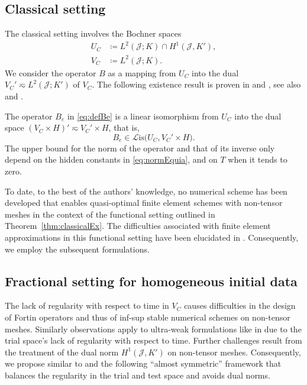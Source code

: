 \documentclass{amsart}
\newcommand{\cJ}{\mathcal J}
\newcommand{\cL}{\mathcal L}
\newcommand{\Lis}{\cL\mathrm{is}}
\begin{document}
\subsection{Classical setting}\label{subsec:ClassicalSetting}
The classical setting involves the Bochner spaces
\begin{align*}
U_C & \coloneqq L^2(\mathcal{J};K) \cap H^1(\mathcal{J},K'),\\
V_C & \coloneqq L^2(\mathcal{J};K).
\end{align*}
We consider the operator $B$ as a mapping from $U_C$ into the dual $V_C' \eqsim L^2(\cJ;K')$ of $V_C$. 
The following existence result is proven in \cite[Thm.~6.6]{ErnGuermond04} and \cite[Thm.~5.1]{SchwabStevenson09}, see also \cite[Chap.~IV, Sec.~26]{Wloka82} and \cite[Chap.~XVIII, Sec.~3]{DautrayLions92}.
\begin{theorem}\label{thm:classicalEx}
The operator $B_e$ in \eqref{eq:defBe} is a linear isomorphism from $U_C$ into the dual space $(V_C \times H)' \eqsim V_C'\times H$, that is, 
\begin{equation*}
B_e \in \Lis\big(U_C,V_C'\times H\big).
\end{equation*} 
The upper bound for the norm of the operator and that of its inverse only depend on the hidden constants in \eqref{eq:normEquia}, and on $T$ when it tends to zero.
\end{theorem}
To date, to the best of the authors' knowledge, no numerical scheme has been developed that enables quasi-optimal finite element schemes with non-tensor meshes in the context of the functional setting outlined in Theorem~\ref{thm:classicalEx}. The difficulties associated with finite element approximations in this functional setting have been elucidated in \cite{StevensonStorn22}. Consequently, we employ the subsequent formulations.
%
\subsection{Fractional setting for homogeneous initial data}\label{subsec:FracSetting}
The lack of regularity with respect to time in $V_C$ causes difficulties in the design of Fortin operators and thus of inf-sup stable numerical schemes on non-tensor meshes.
Similarly observations apply to ultra-weak formulations like in \cite[Sec.~4]{TantardiniVeeser16} due to the trial space's lack of regularity with respect to time.
Further challenges result from the treatment of the dual norm $H^1(\cJ,K')$ on non-tensor meshes.
Consequently, we propose similar to \cite{SchwabStevenson17} and \cite{SteinbachZank20} the following ``almost symmetric'' framework that balances the regularity in the trial and test space and avoids dual norms. 
\end{document}

